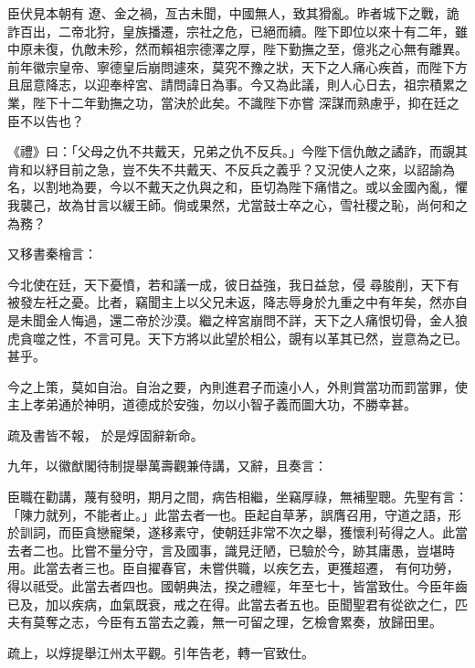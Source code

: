 \begin{pinyinscope}
 臣伏見本朝有
 遼、金之禍，亙古未聞，中國無人，致其猾亂。昨者城下之戰，詭詐百出，二帝北狩，皇族播遷，宗社之危，已絕而續。陛下即位以來十有二年，雖中原未復，仇敵未殄，然而賴祖宗德澤之厚，陛下勤撫之至，億兆之心無有離異。前年徽宗皇帝、寧德皇后崩問遽來，莫究不豫之狀，天下之人痛心疾首，而陛下方且屈意降志，以迎奉梓宮、請問諱日為事。今又為此議，則人心日去，祖宗積累之業，陛下十二年勤撫之功，當決於此矣。不識陛下亦嘗
 深謀而熟慮乎，抑在廷之臣不以告也？



 《禮》曰：「父母之仇不共戴天，兄弟之仇不反兵。」今陛下信仇敵之譎詐，而覬其肯和以紓目前之急，豈不失不共戴天、不反兵之義乎？又況使人之來，以詔諭為名，以割地為要，今以不戴天之仇與之和，臣切為陛下痛惜之。或以金國內亂，懼我襲己，故為甘言以緩王師。倘或果然，尤當鼓士卒之心，雪社稷之恥，尚何和之為務？



 又移書秦檜言：



 今北使在廷，天下憂憤，若和議一成，彼日益強，我日益怠，侵
 尋朘削，天下有被發左衽之憂。比者，竊聞主上以父兄未返，降志辱身於九重之中有年矣，然亦自是未聞金人悔過，還二帝於沙漠。繼之梓宮崩問不詳，天下之人痛恨切骨，金人狼虎貪噬之性，不言可見。天下方將以此望於相公，覬有以革其已然，豈意為之已。甚乎。



 今之上策，莫如自治。自治之要，內則進君子而遠小人，外則賞當功而罰當罪，使主上孝弟通於神明，道德成於安強，勿以小智孑義而圖大功，不勝幸甚。



 疏及書皆不報，
 於是焞固辭新命。



 九年，以徽猷閣待制提舉萬壽觀兼侍講，又辭，且奏言：



 臣職在勸講，蔑有發明，期月之間，病告相繼，坐竊厚祿，無補聖聰。先聖有言：「陳力就列，不能者止。」此當去者一也。臣起自草茅，誤膺召用，守道之語，形於訓詞，而臣貪戀寵榮，遂移素守，使朝廷非常不次之舉，獲懷利茍得之人。此當去者二也。比嘗不量分守，言及國事，識見迂陋，已驗於今，跡其庸愚，豈堪時用。此當去者三也。臣自擢春官，未嘗供職，以疾乞去，更獲超遷，
 有何功勞，得以祗受。此當去者四也。國朝典法，揆之禮經，年至七十，皆當致仕。今臣年齒已及，加以疾病，血氣既衰，戒之在得。此當去者五也。臣聞聖君有從欲之仁，匹夫有莫奪之志，今臣有五當去之義，無一可留之理，乞檢會累奏，放歸田里。



 疏上，以焞提舉江州太平觀。引年告老，轉一官致仕。




\end{pinyinscope}

